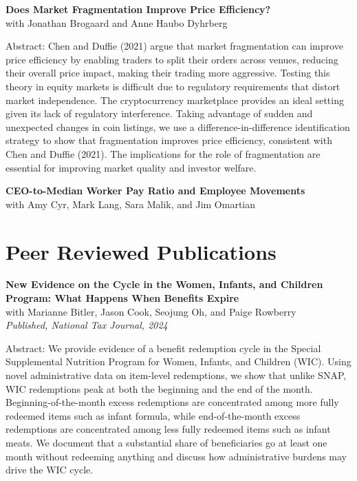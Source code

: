 \documentclass[11pt]{article}
\newcommand{\cvsection}[2][12]{%
\Needspace{#1\baselineskip}%
\section*{#2}%
}
\newenvironment{paperentry}{%
\samepage
}{%
\vspace{0.6em}%
\par
}
\begin{document}
\clearpage

\begin{paperentry}
\textbf{Does Market Fragmentation Improve Price Efficiency?}\\
with Jonathan Brogaard and Anne Haubo Dyhrberg

Abstract: Chen and Duffie (2021) argue that market fragmentation can improve price efficiency by enabling traders to split their orders across venues, reducing their overall price impact, making their trading more aggressive. Testing this theory in equity markets is difficult due to regulatory requirements that distort market independence. The cryptocurrency marketplace provides an ideal setting given its lack of regulatory interference. Taking advantage of sudden and unexpected changes in coin listings, we use a difference-in-difference identification strategy to show that fragmentation improves price efficiency, consistent with Chen and Duffie (2021). The implications for the role of fragmentation are essential for improving market quality and investor welfare.
\end{paperentry}

\begin{paperentry}
\textbf{CEO-to-Median Worker Pay Ratio and Employee Movements}\\
with Amy Cyr, Mark Lang, Sara Malik, and Jim Omartian
\end{paperentry}

\cvsection{Peer Reviewed Publications}
\begin{paperentry}
\textbf{New Evidence on the Cycle in the Women, Infants, and Children Program: What Happens When Benefits Expire}\\
with Marianne Bitler, Jason Cook, Seojung Oh, and Paige Rowberry\\
\emph{Published, National Tax Journal, 2024}

Abstract: We provide evidence of a benefit redemption cycle in the Special Supplemental Nutrition Program for Women, Infants, and Children (WIC). Using novel administrative data on item-level redemptions, we show that unlike SNAP, WIC redemptions peak at both the beginning and the end of the month. Beginning-of-the-month excess redemptions are concentrated among more fully redeemed items such as infant formula, while end-of-the-month excess redemptions are concentrated among less fully redeemed items such as infant meats. We document that a substantial share of beneficiaries go at least one month without redeeming anything and discuss how administrative burdens may drive the WIC cycle.
\end{paperentry}
\end{document}
